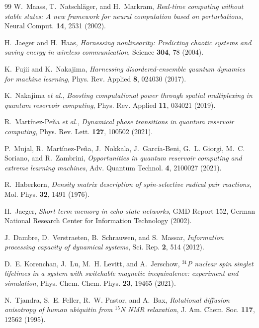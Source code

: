 \documentclass[aps,prx,reprint,superscriptaddress,nofootinbib,floatfix]{revtex4-2}
\begin{document}
\begin{thebibliography}{99}
 W.~Maass, T.~Natschläger, and H.~Markram,
\textit{Real-time computing without stable states: A new framework for neural
computation based on perturbations}, Neural Comput. \textbf{14}, 2531 (2002).

 H.~Jaeger and H.~Haas,
\textit{Harnessing nonlinearity: Predicting chaotic systems and saving energy in
wireless communication}, Science \textbf{304}, 78 (2004).

 K.~Fujii and K.~Nakajima,
\textit{Harnessing disordered-ensemble quantum dynamics for machine learning},
Phys. Rev. Applied \textbf{8}, 024030 (2017).

 K.~Nakajima \textit{et al.},
\textit{Boosting computational power through spatial multiplexing in quantum
reservoir computing}, Phys. Rev. Applied \textbf{11}, 034021 (2019).

 R.~Martínez-Peña \textit{et al.},
\textit{Dynamical phase transitions in quantum reservoir computing},
Phys. Rev. Lett. \textbf{127}, 100502 (2021).

 P.~Mujal, R.~Martínez-Peña, J.~Nokkala, J.~García-Beni,
G.~L. Giorgi, M.~C. Soriano, and R.~Zambrini,
\textit{Opportunities in quantum reservoir computing and extreme learning
machines}, Adv. Quantum Technol. \textbf{4}, 2100027 (2021).

 R.~Haberkorn,
\textit{Density matrix description of spin-selective radical pair reactions},
Mol. Phys. \textbf{32}, 1491 (1976).

 H.~Jaeger,
\textit{Short term memory in echo state networks},
GMD Report 152, German National Research Center for Information Technology (2002).

 J.~Dambre, D.~Verstraeten, B.~Schrauwen, and S.~Massar,
\textit{Information processing capacity of dynamical systems},
Sci. Rep. \textbf{2}, 514 (2012).

 D.~E. Korenchan, J.~Lu, M.~H. Levitt, and A.~Jerschow,
\textit{$^{31}$P nuclear spin singlet lifetimes in a system with switchable
magnetic inequivalence: experiment and simulation},
Phys. Chem. Chem. Phys. \textbf{23}, 19465 (2021).

 N.~Tjandra, S.~E. Feller, R.~W. Pastor, and A.~Bax,
\textit{Rotational diffusion anisotropy of human ubiquitin from $^{15}$N NMR
relaxation}, J. Am. Chem. Soc. \textbf{117}, 12562 (1995).


\end{thebibliography}
\end{document}
